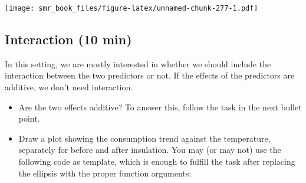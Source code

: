 \documentclass[
  oneside]{book}
\newenvironment{Shaded}{\begin{snugshade}}{\end{snugshade}}
\newcommand{\AttributeTok}[1]{\textcolor[rgb]{0.77,0.63,0.00}{#1}}
\newcommand{\DecValTok}[1]{\textcolor[rgb]{0.00,0.00,0.81}{#1}}
\newcommand{\FunctionTok}[1]{\textcolor[rgb]{0.00,0.00,0.00}{#1}}
\newcommand{\NormalTok}[1]{#1}
\newcommand{\SpecialCharTok}[1]{\textcolor[rgb]{0.00,0.00,0.00}{#1}}
\newcommand{\StringTok}[1]{\textcolor[rgb]{0.31,0.60,0.02}{#1}}
\providecommand{\tightlist}{%
  \setlength{\itemsep}{0pt}\setlength{\parskip}{0pt}}
\begin{document}
\begin{Shaded}
\end{Shaded}

\texttt{[image: smr\_book\_files/figure-latex/unnamed-chunk-277-1.pdf]}

\hypertarget{interaction-10-min}{%
\subsection{Interaction (10 min)}\label{interaction-10-min}}

In this setting, we are mostly interested in whether we should
include the interaction between the two predictors or not.
If the effects of the predictors are additive, we don't need
interaction.

\begin{itemize}
\tightlist
\item
  Are the two effects additive? To answer this, follow the task in
  the next bullet point.
\item
  Draw a plot showing the consumption trend against the temperature,
  separately for before and after insulation. You may (or may not)
  use the following code as template, which is enough to fulfill the
  task after replacing the ellipsis with the proper function arguments:
\end{itemize}
\end{document}
